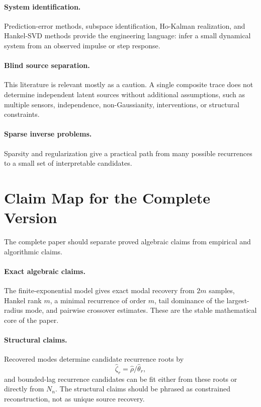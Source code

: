 \documentclass[10pt,twocolumn]{article}
\begin{document}
\paragraph{System identification.}
Prediction-error methods, subspace identification, Ho-Kalman realization, and
Hankel-SVD methods provide the engineering language: infer a small dynamical
system from an observed impulse or step response.

\paragraph{Blind source separation.}
This literature is relevant mostly as a caution. A single composite trace does
not determine independent latent sources without additional assumptions, such
as multiple sensors, independence, non-Gaussianity, interventions, or structural
constraints.

\paragraph{Sparse inverse problems.}
Sparsity and regularization give a practical path from many possible
recurrences to a small set of interpretable candidates.

\section{Claim Map for the Complete Version}

The complete paper should separate proved algebraic claims from empirical and
algorithmic claims.

\paragraph{Exact algebraic claims.}
The finite-exponential model gives exact modal recovery from \(2m\) samples,
Hankel rank \(m\), a minimal recurrence of order \(m\), tail dominance of the
largest-radius mode, and pairwise crossover estimates. These are the stable
mathematical core of the paper.

\paragraph{Structural claims.}
Recovered modes determine candidate recurrence roots by
\[
        \widehat\zeta_r=\widehat\rho/\widehat\theta_r,
\]
and bounded-lag recurrence candidates can be fit either from these roots or
directly from \(N_n\). The structural claims should be phrased as constrained
reconstruction, not as unique source recovery.
\end{document}
